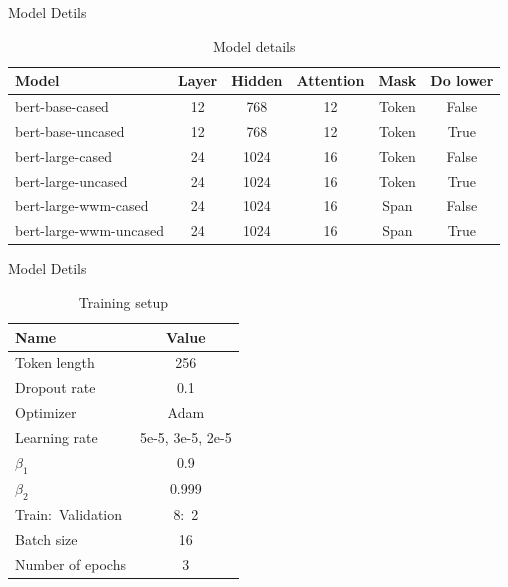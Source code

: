 \documentclass[
 size=14pt,
 paper=smartboard,  %
 mode=present, 		%
 display=slides, 	%
 style=tuliplab,  	%
 pauseslide,
 fleqn,leqno]{powerdot}
\begin{document}
\begin{slide}{Model Detils}
	
\bigskip	\bigskip	\bigskip	\bigskip	
\begin{table}[htbp]
	\setlength{\abovecaptionskip}{0pt}
	\setlength{\belowcaptionskip}{10pt}
	\centering
	\caption{Model details}
	
	\begin{tabular}{lccccc}
		\hline
		Model                 & Layer  & Hidden  & Attention & Mask  & Do lower   \\
		\hline
		bert-base-cased   & 12    & 768     & 12    & Token & False   \\
		bert-base-uncased     & 12    & 768        & 12     & Token    & True      \\
		bert-large-cased         & 24      & 1024    & 16 & Token & False \\
		bert-large-uncased   & 24    & 1024   & 16    & Token & True  \\
		bert-large-wwm-cased         & 24    & 1024     & 16     & Span  & False  \\
		bert-large-wwm-uncased        & 24    & 1024     & 16    & Span   & True    \\
		\hline
	\end{tabular}
\end{table}

	
\end{slide}


\begin{slide}[toc=,bm=]{Model Detils}
	
	\bigskip	\bigskip
	\begin{table}[htbp]
		\setlength{\abovecaptionskip}{0pt}
		\setlength{\belowcaptionskip}{10pt}
		\centering
		\caption{Training setup}
		
		\begin{tabular}{lc}
			\hline
			Name                 & Value     \\
			\hline
			Token length   & 256     \\
			Dropout rate     & 0.1    \\
			Optimizer         & Adam      \\
			Learning rate   & 5e-5, 3e-5, 2e-5   \\
			$\beta_1$          & 0.9    \\
			$\beta_2$         & 0.999   \\
			Train:\ Validation         & 8:\ 2   \\
			Batch size         & 16   \\
			Number of epochs         & 3   \\
			\hline
		\end{tabular}
	\end{table}
	
\end{slide}
\end{document}

